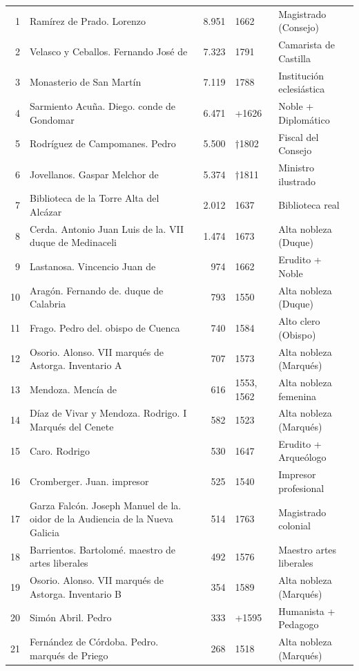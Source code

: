 \begin{longtable}{rlrll}
\rowcolor{yellow!20}
1 & Ramírez de Prado.  Lorenzo & 8.951 & 1662 & Magistrado (Consejo) \\
\rowcolor{yellow!20}
2 & Velasco y Ceballos. Fernando José de & 7.323 & 1791 & Camarista de Castilla \\
\rowcolor{yellow!20}
3 & Monasterio de San Martín & 7.119 & 1788 & Institución eclesiástica \\
\rowcolor{yellow!20}
4 & Sarmiento Acuña.  Diego. conde de Gondomar & 6.471 & +1626 & Noble + Diplomático \\
\rowcolor{yellow!20}
5 & Rodríguez de Campomanes. Pedro & 5.500 & †1802 & Fiscal del Consejo \\
\rowcolor{yellow!20}
6 & Jovellanos. Gaspar Melchor de & 5.374 & †1811 & Ministro ilustrado \\
7 & Biblioteca de la Torre Alta del Alcázar & 2.012 & 1637 & Biblioteca real \\
8 & Cerda. Antonio Juan Luis de la. VII duque de Medinaceli & 1.474 & 1673 & Alta nobleza (Duque) \\
9 & Lastanosa. Vincencio Juan de & 974 & 1662 & Erudito + Noble \\
10 & Aragón. Fernando de. duque de Calabria & 793 & 1550 & Alta nobleza (Duque) \\
11 & Frago. Pedro del. obispo de Cuenca & 740 & 1584 & Alto clero (Obispo) \\
12 & Osorio. Alonso. VII marqués de Astorga. Inventario A & 707 & 1573 & Alta nobleza (Marqués) \\
13 & Mendoza. Mencía de & 616 & 1553, 1562 & Alta nobleza femenina \\
14 & Díaz de Vivar y Mendoza. Rodrigo. I Marqués del Cenete & 582 & 1523 & Alta nobleza (Marqués) \\
15 & Caro. Rodrigo & 530 & 1647 & Erudito + Arqueólogo \\
16 & Cromberger. Juan. impresor & 525 & 1540 & Impresor profesional \\
17 & Garza Falcón. Joseph Manuel de la. oidor de la Audiencia de la Nueva Galicia & 514 & 1763 & Magistrado colonial \\
18 & Barrientos. Bartolomé. maestro de artes liberales & 492 & 1576 & Maestro artes liberales \\
19 & Osorio. Alonso. VII marqués de Astorga. Inventario B & 354 & 1589 & Alta nobleza (Marqués) \\
20 & Simón Abril. Pedro & 333 & +1595 & Humanista + Pedagogo \\
21 & Fernández de Córdoba. Pedro. marqués de Priego & 268 & 1518 & Alta nobleza (Marqués) \\

\end{longtable}
